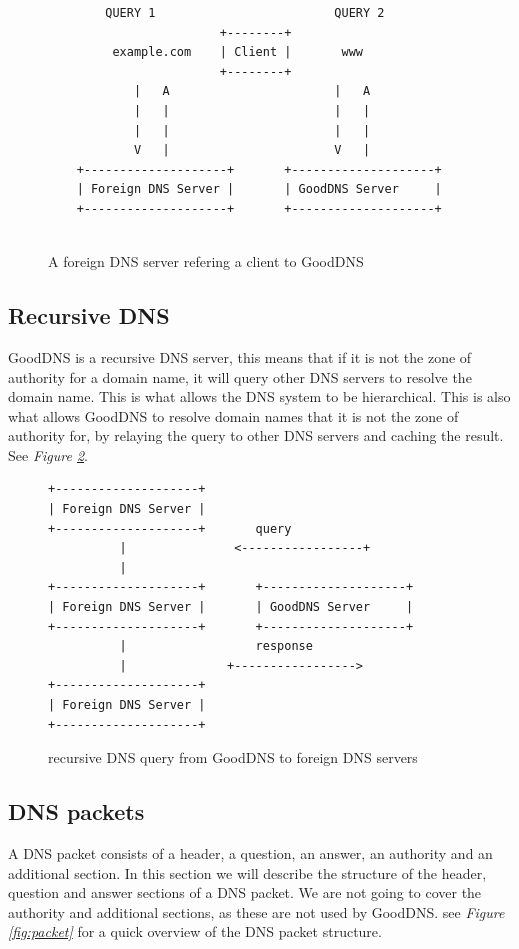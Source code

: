 \documentclass[12pt]{article}
\begin{document}
\begin{figure}[h]
    \begin{lstlisting}
        QUERY 1                         QUERY 2
                        +--------+
         example.com    | Client |       www
                        +--------+       
            |   A                       |   A   
            |   |                       |   |
            |   |                       |   |
            V   |                       V   |
    +--------------------+       +--------------------+
    | Foreign DNS Server |       | GoodDNS Server     |
    +--------------------+       +--------------------+
    
    \end{lstlisting}
    \caption{A foreign DNS server refering a client to GoodDNS}
    \label{fig:NS}
\end{figure}

\subsection{Recursive DNS}
GoodDNS is a recursive DNS server, this means that if it is not the zone of authority for a domain name, 
it will query other DNS servers to resolve the domain name. This is what allows the DNS system to be hierarchical.
This is also what allows GoodDNS to resolve domain names that it is not the zone of authority for, by relaying the query to other DNS servers and 
caching the result. See \textit{Figure \ref{fig:recursive}}.

\begin{figure}[h!]
\begin{lstlisting}
+--------------------+
| Foreign DNS Server |
+--------------------+       query
          |               <-----------------+
          |                
+--------------------+       +--------------------+
| Foreign DNS Server |       | GoodDNS Server     |
+--------------------+       +--------------------+
          |                  response
          |              +----------------->
+--------------------+    
| Foreign DNS Server |
+--------------------+
\end{lstlisting}
\caption{recursive DNS query from GoodDNS to foreign DNS servers}
\label{fig:recursive}
\end{figure}

\subsection{DNS packets}
A DNS packet consists of a header, a question, an answer, an authority and an additional section.
In this section we will describe the structure of the header, question and answer sections of a DNS packet.
We are not going to cover the authority and additional sections, as these are not used by GoodDNS.
see \textit{Figure \ref{fig:packet}} for a quick overview of the DNS packet structure.
\\
\\
\\
\\
\\
\\
\\
\\
\end{document}

